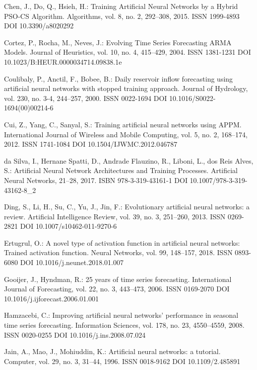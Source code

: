 \begin{thebibliography}{99.}
 Chen, J., Do, Q., Hsieh, H.: Training Artificial Neural Networks by a Hybrid PSO-CS Algorithm. Algorithms, vol. 8, no. 2, 292--308, 2015. ISSN 1999-4893 DOI 10.3390/a8020292

 Cortez, P., Rocha, M., Neves, J.: Evolving Time Series Forecasting ARMA Models. Journal of Heuristics, vol. 10, no. 4, 415--429, 2004. ISSN 1381-1231 DOI 10.1023/B:HEUR.0000034714.09838.1e

 Coulibaly, P., Anctil, F., Bobee, B.: Daily reservoir inflow forecasting using artificial neural networks with stopped training approach. Journal of Hydrology, vol. 230, no. 3-4, 244--257, 2000. ISSN 0022-1694 DOI 10.1016/S0022-1694(00)00214-6

 Cui, Z., Yang, C., Sanyal, S.: Training artificial neural networks using APPM. International Journal of Wireless and Mobile Computing, vol. 5, no. 2, 168--174, 2012. ISSN 1741-1084 DOI 10.1504/IJWMC.2012.046787

 da Silva, I., Hernane Spatti, D., Andrade Flauzino, R., Liboni, L., dos Reis Alves, S.: Artificial Neural Network Architectures and Training Processes. Artificial Neural Networks, 21--28, 2017. ISBN 978-3-319-43161-1 DOI 10.1007/978-3-319-43162-8\_2

 Ding, S., Li, H., Su, C., Yu, J., Jin, F.: Evolutionary artificial neural networks: a review. Artificial Intelligence Review, vol. 39, no. 3, 251--260, 2013. ISSN 0269-2821 DOI 10.1007/s10462-011-9270-6

 Ertugrul, O.: A novel type of activation function in artificial neural networks: Trained activation function. Neural Networks, vol. 99, 148--157, 2018. ISSN 0893-6080 DOI 10.1016/j.neunet.2018.01.007

 Gooijer, J., Hyndman, R.: 25 years of time series forecasting. International Journal of Forecasting, vol. 22, no. 3, 443--473, 2006. ISSN 0169-2070 DOI 10.1016/j.ijforecast.2006.01.001

 Hamzacebi, C.: Improving artificial neural networks’ performance in seasonal time series forecasting. Information Sciences, vol. 178, no. 23, 4550--4559, 2008. ISSN 0020-0255 DOI 10.1016/j.ins.2008.07.024

 Jain, A., Mao, J., Mohiuddin, K.: Artificial neural networks: a tutorial. Computer, vol. 29, no. 3, 31--44, 1996. ISSN 0018-9162 DOI 10.1109/2.485891


\end{thebibliography}
